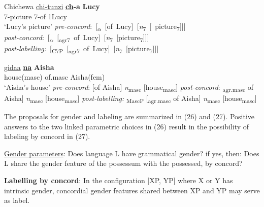 \documentclass[output=paper
,modfonts
,nonflat]{langsci/langscibook}
\begin{document}
\begin{exe} \settowidth{}
	\ex 
	\xlist
	\ex Chichewa \newline
	\gll \underline{chi-tunzi}    \textbf{\underline{ch}-a}  \textbf{Lucy} \\
	7-picture    7-of     1Lucy\\
	\glt `Lucy’s picture'  	
	\ex \mbox{\textit{pre-concord}:   [\textsubscript{$\alpha$} [of Lucy] [\textit{n}\textsubscript{7} [ picture\textsubscript{7}]]]}\\  
	\ex \mbox{\textit{post-concord}:   [\textsubscript{$\alpha$} [\textsubscript{agr7} of Lucy] [\textit{n}\textsubscript{7} [picture\textsubscript{7}]]]}\\ 
	\ex \mbox{\textit{post-labelling:} [\textsubscript{C7P} [\textsubscript{agr7} of Lucy] [\textit{n}\textsubscript{7} [picture\textsubscript{7}]]]}\\ 
	\endxlist
\end{exe}
\begin{exe}
	\ex 
	\xlist
	\ex 
	\gll \underline{gidaa}    \textbf{\underline{na}}  \textbf{Aisha} \\
	house(masc)   of.masc   Aisha(fem)\\
	\glt `Aisha's house'  	
	\ex \textit{pre-concord}:   {\lbrack}[of Aisha] \textit{n}\textsubscript{masc} [house\textsubscript{masc}]{\rbrack}
	\ex \textit{post-concord}:   {\lbrack}\textsubscript{agr.masc} of Aisha] \textit{n}\textsubscript{masc} [house\textsubscript{masc}]{\rbrack}
	\ex \textit{post-labelling:} {\lbrack}\textsubscript{MascP} [\textsubscript{agr.masc} of Aisha] \textit{n}\textsubscript{masc} [house\textsubscript{masc}]{\rbrack}
	\endxlist
\end{exe}
The proposals for gender and labeling are summarized in (26) and (27). Positive answers to the two linked parametric choices in (26) result in the possibility of labeling by concord in (27). 

\begin{exe}
\ex \underline{Gender parameters}:
\xlist
\ex Does language L have grammatical gender? if yes, then:                   
\ex Does L share the gender feature of the possessum with the possessed, by concord?
\endxlist
\end{exe}
\begin{exe}
\ex 
\textbf{Labelling by concord}: In the configuration [XP, YP] where X or Y has intrinsic gender, concordial gender features shared between XP and YP may serve as label.
\end{exe}
\end{document}
